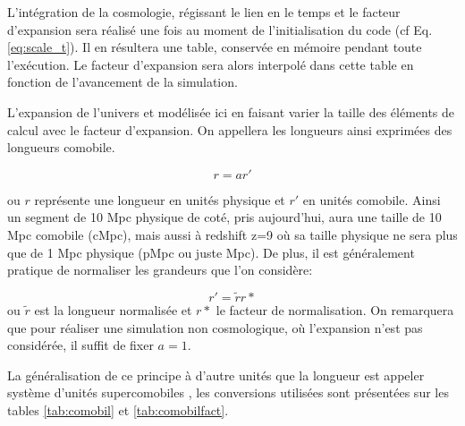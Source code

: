 L'intégration de la cosmologie, régissant le lien en le temps et le facteur d'expansion sera réalisé une fois au moment de l'initialisation du code (cf Eq. \ref{eq:scale_t}).
Il en résultera une table, conservée en mémoire pendant toute l'exécution.
Le facteur d'expansion sera alors interpolé dans cette table en fonction de l'avancement de la simulation.%


L'expansion de l'univers et modélisée ici en faisant varier la taille des éléments de calcul avec le facteur d'expansion.
On appellera les longueurs ainsi exprimées des longueurs comobile.

\begin{equation}
r=a r'
\end{equation}

ou $r$ représente une longueur en unités physique et $r'$ en unités comobile.
Ainsi un segment de 10 Mpc physique de coté, pris aujourd'hui, aura une taille de 10 Mpc comobile (cMpc), mais aussi à redshift z=9 où sa taille physique ne sera plus que de 1 Mpc physique (pMpc ou juste Mpc).
De plus, il est généralement pratique de normaliser les grandeurs que l'on considère:

\begin{equation}
r'=\tilde{r}r*
\end{equation}
ou $\tilde{r}$ est la longueur normalisée et $r*$ le facteur de normalisation.
On remarquera que pour réaliser une simulation non cosmologique, où l'expansion n'est pas considérée, il suffit de fixer $a=1$.

La généralisation de ce principe à d'autre unités que la longueur est appeler système d'unités supercomobiles \citep{martel_convenient_1998}, les conversions utilisées sont présentées sur les tables \ref{tab:comobil} et \ref{tab:comobilfact}.

